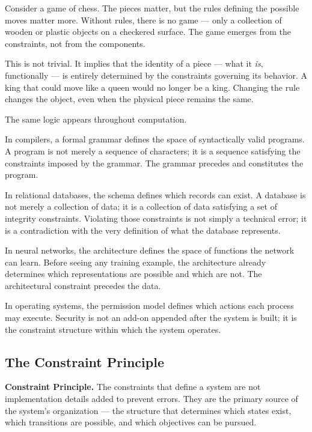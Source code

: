 \documentclass[11pt, a4paper]{article}
\theoremstyle{named}
\begin{document}
Consider a game of chess. The pieces matter, but the rules defining
the possible moves matter more. Without rules, there is no game ---
only a collection of wooden or plastic objects on a checkered surface.
The game emerges from the constraints, not from the components.

This is not trivial. It implies that the identity of a piece ---
what it \emph{is}, functionally --- is entirely determined by the
constraints governing its behavior. A king that could move like a
queen would no longer be a king. Changing the rule changes the object,
even when the physical piece remains the same.

The same logic appears throughout computation.

In compilers, a formal grammar defines the space of syntactically
valid programs. A program is not merely a sequence of characters; it
is a sequence satisfying the constraints imposed by the grammar. The
grammar precedes and constitutes the program.

In relational databases, the schema defines which records can exist.
A database is not merely a collection of data; it is a collection of
data satisfying a set of integrity constraints. Violating those
constraints is not simply a technical error; it is a contradiction
with the very definition of what the database represents.

In neural networks, the architecture defines the space of functions
the network can learn. Before seeing any training example, the
architecture already determines which representations are possible
and which are not. The architectural constraint precedes the data.

In operating systems, the permission model defines which actions each
process may execute. Security is not an add-on appended after the
system is built; it is the constraint structure within which the
system operates.

\subsection{The Constraint Principle}

\begin{keybox}
\textbf{Constraint Principle.} The constraints that define a system
are not implementation details added to prevent errors. They are the
primary source of the system's organization --- the structure that
determines which states exist, which transitions are possible, and
which objectives can be pursued.
\end{keybox}
\end{document}
